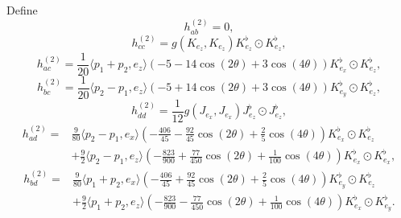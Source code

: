 \documentclass[11pt]{amsart}
\theoremstyle{definition}
\begin{document}
Define
\begin{equation*}\label{def.hab}
h^{(2)}_{ab}= 0,
\end{equation*}
\begin{equation*}\label{def.hcc}
h^{(2)}_{cc}= g(K_{e_z},K_{e_z}) K^\flat_{e_z}\odot K^\flat_{e_z},
\end{equation*}
\begin{equation*}\label{def.hac}
h^{(2)}_{ac}=\frac{1}{20}\langle p_1+p_2,e_z  \rangle(-5-14\cos(2\theta)+3\cos(4\theta))K^\flat_{e_x}\odot K^\flat_{e_z},
\end{equation*}
\begin{equation*}\label{def.hbc}
h^{(2)}_{bc}=\frac{1}{20}\langle p_2-p_1,e_z  \rangle(-5+14\cos(2\theta)+3\cos(4\theta))K^\flat_{e_y}\odot K^\flat_{e_z},
\end{equation*}
\begin{equation*}\label{def.hdd}
h_{dd}^{(2)}=\frac{1}{12} g(J_{e_x},J_{e_x}) J^\flat_{e_z}\odot J^\flat_{e_z},
\end{equation*}
\begin{equation*}\label{def.had}
\begin{split}
h^{(2)}_{ad}=&\frac{9}{80}\langle p_2-p_1,e_x \rangle\left(-\frac{406}{45} -\frac{92}{45} \cos (2 \theta )+\frac{2}{5} \cos (4 \theta ) \right) K^\flat_{e_x}\odot K^\flat_{e_z}\\
&+\frac{9}{2}\langle p_2-p_1,e_z  \rangle\left(-\frac{823}{900}+ \frac{77}{450} \cos (2 \theta )+\frac{1}{100} \cos (4 \theta )  \right)K^\flat_{e_x}\odot K^\flat_{e_x},
\end{split}
\end{equation*}
\begin{equation*}\label{def.hbd}
\begin{split}
h_{bd}^{(2)}=&\frac{9}{80}\langle p_1+p_2,e_x \rangle\left(-\frac{406}{45}+\frac{92}{45} \cos (2 \theta )+\frac{2}{5} \cos (4 \theta ) \right)K^\flat_{e_y}\odot K^\flat_{e_z}\\
&+\frac{9}{2}\langle p_1+p_2,e_z \rangle \left( -\frac{823}{900} -\frac{77}{450} \cos (2 \theta )+\frac{1}{100} \cos (4 \theta ) \right)K^\flat_{e_x}\odot K^\flat_{e_y}.
\end{split}
\end{equation*}
\end{document}
